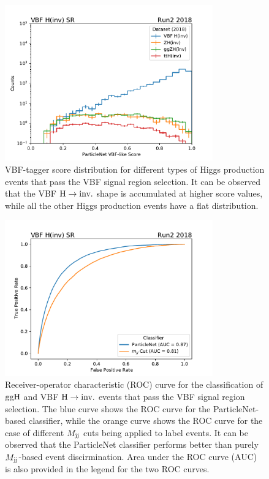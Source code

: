 \begin{figure}[htbp]
    \centering
    \includegraphics[width=0.8\textwidth]{VBFML/sr_vbf_no_veto_all_particlenet_score.pdf}
    \caption{VBF-tagger score distribution for different types of Higgs production events that pass the VBF signal region selection.
    It can be observed that the VBF $\textrm{H} \rightarrow \textrm{inv.}$ shape is accumulated at higher score values, while all the other Higgs production events
    have a flat distribution.}
    \label{fig:score_distribution_hinv_events}
\end{figure}

\begin{figure}[htbp]
    \centering
    \includegraphics[width=0.8\textwidth]{VBFML/ggH_vs_vbfH_ROC.pdf}
    \caption{Receiver-operator characteristic (ROC) curve for the classification of $\mathrm{ggH}$ and VBF $\textrm{H} \rightarrow \textrm{inv.}$ events that pass the VBF signal region
    selection. The blue curve shows the ROC curve for the ParticleNet-based classifier, while the orange curve shows the ROC curve for the case
    of different $M_{\textrm{jj}}$ cuts being applied to label events. It can be observed that the ParticleNet classifier performs better than purely $M_{\textrm{jj}}$-based 
    event discirmination. Area under the ROC curve (AUC) is also provided in the legend for the two ROC curves.}
    \label{fig:ggh_vs_vbfh_roc}
\end{figure}

